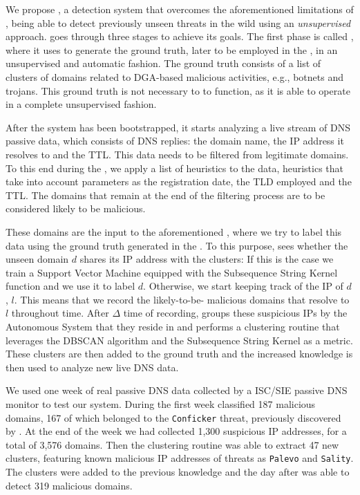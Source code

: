 We propose \thesystem, a detection system that overcomes the aforementioned limitations of
\phoenix, being able to detect previously unseen threats in the wild using
an \emph{unsupervised} approach.
\thesystem goes through three stages to achieve its goals. The first phase is
called , where it uses \phoenix to generate the
ground truth, later to be employed in the , in an
unsupervised and automatic fashion. The ground
truth consists of a list of clusters of domains related to DGA-based malicious
activities, e.g., botnets and trojans. This ground truth is not necessary to
\thesystem to function, as it is able to operate in a complete unsupervised fashion.

After the system has been bootstrapped, it starts analyzing a live
stream of DNS passive data, which consists of DNS replies: the domain name, the IP
address it resolves to and the TTL. This data needs to be filtered from legitimate
domains. To this end during the , we apply a list of heuristics to the data, heuristics that take into account parameters as the
registration date, the TLD employed and the TTL. The domains that remain at the
end of the filtering process are to be considered likely to be malicious.

These domains are the input to the aforementioned ,
where we try to label this data using the ground truth generated in the
. To this purpose, \thesystem sees whether the unseen
domain $d$ shares its IP address with the clusters: If this is the case we train
a Support Vector Machine equipped with the Subsequence String
Kernel~\cite{lodhi2002} function and we use it to label $d$. Otherwise, we start
keeping track of the IP of $d$, $l$. This means that we record the likely-to-be-
malicious domains that
resolve to $l$ throughout time. After $\Delta$ time of recording, \thesystem groups
these suspicious IPs by the Autonomous System that they reside in and performs a
clustering routine that leverages the DBSCAN algorithm and the Subsequence String
Kernel as a metric. These clusters are then added to the ground truth and the
increased knowledge is then used to analyze new live DNS data.

We used one week of real passive DNS data collected by a ISC/SIE
passive DNS monitor to test our system. During the first week \thesystem classified 187 malicious
domains, 167 of which belonged to the \texttt{Conficker} threat, previously
discovered by \phoenix. At the end of the week we had collected 1,300 suspicious
IP addresses, for a total of 3,576 domains. Then the clustering routine was able
to extract 47 new clusters, featuring known malicious IP addresses of
threats as \texttt{Palevo} and \texttt{Sality}. The clusters were added to the
previous knowledge and the day after \thesystem was able to detect 319 malicious
domains.

